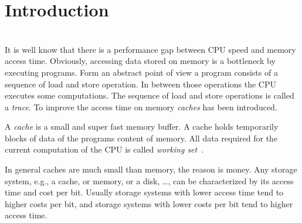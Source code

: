 \documentclass[onecolumn, openright, master, english, signatures]{dbrgrptt}
\begin{document}

%
\thesisdate{\today}%
%
%

\frontmatter%

%


\mainmatter%


\chapter{Introduction}\label{cha:introduction}
\torevise\\
It is well know that there is a performance gap between CPU speed and memory access time. Obviously, accessing data stored on memory is a bottleneck by executing programs. Form an abstract point of view a program consists of a sequence of load and store operation. In between those operations the CPU executes some computations. The sequence of load and store operations is called a \emph{trace}. To improve the access time on memory \emph{caches} has been introduced.

A \emph{cache} is a small and super fast memory buffer. A cache holds temporarily blocks of data of the programs content of memory. All data required for the current computation of the CPU is called \emph{working set}~\cite{denning1968working}.

In general caches are much small than memory, the reason is money. Any storage system, e.g., a cache, or memory, or a disk, \dots, can be characterized by its access time and cost per bit. Usually storage systems with lower access time tend to higher costs per bit, and storage systems with lower costs per bit tend to higher access time.
\end{document}
